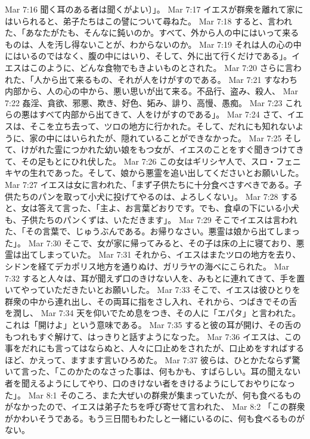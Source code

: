 Mar 7:16  聞く耳のある者は聞くがよい〕」。
Mar 7:17  イエスが群衆を離れて家にはいられると、弟子たちはこの譬について尋ねた。
Mar 7:18  すると、言われた、「あなたがたも、そんなに鈍いのか。すべて、外から人の中にはいって来るものは、人を汚し得ないことが、わからないのか。
Mar 7:19  それは人の心の中にはいるのではなく、腹の中にはいり、そして、外に出て行くだけである」。イエスはこのように、どんな食物でもきよいものとされた。
Mar 7:20  さらに言われた、「人から出て来るもの、それが人をけがすのである。
Mar 7:21  すなわち内部から、人の心の中から、悪い思いが出て来る。不品行、盗み、殺人、
Mar 7:22  姦淫、貪欲、邪悪、欺き、好色、妬み、誹り、高慢、愚痴。
Mar 7:23  これらの悪はすべて内部から出てきて、人をけがすのである」。
Mar 7:24  さて、イエスは、そこを立ち去って、ツロの地方に行かれた。そして、だれにも知れないように、家の中にはいられたが、隠れていることができなかった。
Mar 7:25  そして、けがれた霊につかれた幼い娘をもつ女が、イエスのことをすぐ聞きつけてきて、その足もとにひれ伏した。
Mar 7:26  この女はギリシヤ人で、スロ・フェニキヤの生れであった。そして、娘から悪霊を追い出してくださいとお願いした。
Mar 7:27  イエスは女に言われた、「まず子供たちに十分食べさすべきである。子供たちのパンを取って小犬に投げてやるのは、よろしくない」。
Mar 7:28  すると、女は答えて言った、「主よ、お言葉どおりです。でも、食卓の下にいる小犬も、子供たちのパンくずは、いただきます」。
Mar 7:29  そこでイエスは言われた、「その言葉で、じゅうぶんである。お帰りなさい。悪霊は娘から出てしまった」。
Mar 7:30  そこで、女が家に帰ってみると、その子は床の上に寝ており、悪霊は出てしまっていた。
Mar 7:31  それから、イエスはまたツロの地方を去り、シドンを経てデカポリス地方を通りぬけ、ガリラヤの海べにこられた。
Mar 7:32  すると人々は、耳が聞えず口のきけない人を、みもとに連れてきて、手を置いてやっていただきたいとお願いした。
Mar 7:33  そこで、イエスは彼ひとりを群衆の中から連れ出し、その両耳に指をさし入れ、それから、つばきでその舌を潤し、
Mar 7:34  天を仰いでため息をつき、その人に「エパタ」と言われた。これは「開けよ」という意味である。
Mar 7:35  すると彼の耳が開け、その舌のもつれもすぐ解けて、はっきりと話すようになった。
Mar 7:36  イエスは、この事をだれにも言ってはならぬと、人々に口止めをされたが、口止めをすればするほど、かえって、ますます言いひろめた。
Mar 7:37  彼らは、ひとかたならず驚いて言った、「このかたのなさった事は、何もかも、すばらしい。耳の聞えない者を聞えるようにしてやり、口のきけない者をきけるようにしておやりになった」。
Mar 8:1  そのころ、また大ぜいの群衆が集まっていたが、何も食べるものがなかったので、イエスは弟子たちを呼び寄せて言われた、
Mar 8:2  「この群衆がかわいそうである。もう三日間もわたしと一緒にいるのに、何も食べるものがない。
